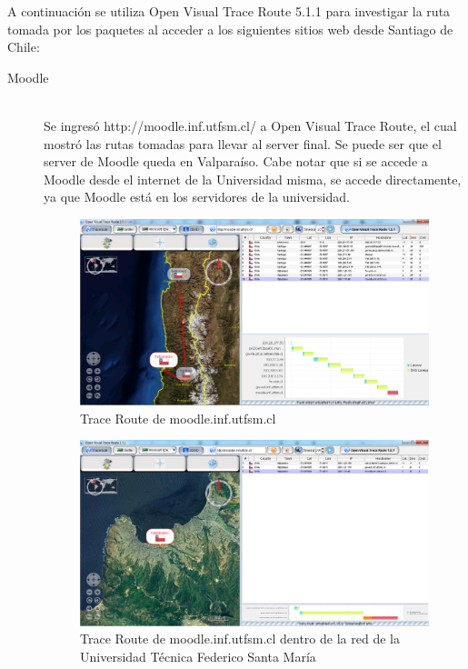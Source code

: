 \documentclass{article}
\begin{document}
A continuación se utiliza Open Visual Trace Route 5.1.1 para investigar la ruta tomada por los paquetes al acceder a los siguientes sitios web desde Santiago de Chile:
\begin{description}
\item[Moodle] \hfill \\
Se ingresó http://moodle.inf.utfsm.cl/ a Open Visual Trace Route, el cual mostró las rutas tomadas para llevar al server final. Se puede ser que el server de Moodle queda en Valparaíso. Cabe notar que si se accede a Moodle desde el internet de la Universidad misma, se accede directamente, ya que Moodle está en los servidores de la universidad.

\begin{figure}[H]
\centering
\includegraphics[width=\textwidth]{tracerouteMoodle.png}
\caption{Trace Route de moodle.inf.utfsm.cl}
\label{fig:moodle}
\end{figure}  

\begin{figure}[H]
\centering
\includegraphics[width=\textwidth]{tracerouteMoodleValpo.png}
\caption{Trace Route de moodle.inf.utfsm.cl dentro de la red de la Universidad Técnica Federico Santa María}
\label{fig:moodle valparaiso}
\end{figure}  


\end{description}
\end{document}
